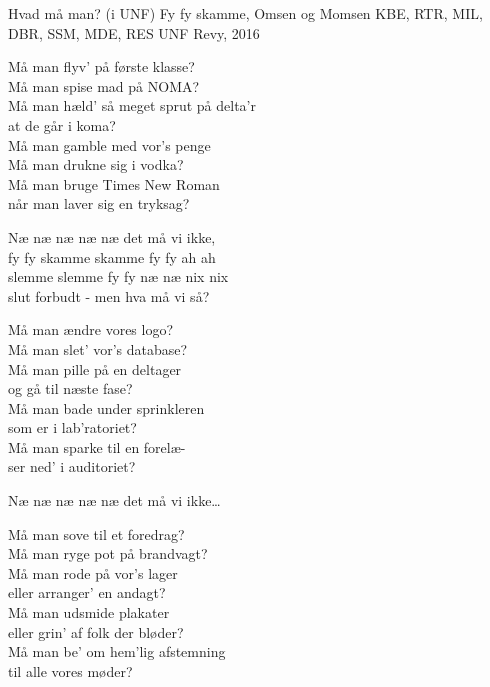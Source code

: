 \begin{song}{Hvad må man? (i UNF)}
  {} %
  {Fy fy skamme, Omsen og Momsen} %
  {KBE, RTR, MIL, DBR, SSM, MDE, RES} %
  {UNF Revy, 2016} %
  {\NotCCLIed} %

  \begin{SBVerse}
    Må man flyv’ på første klasse?\\
    Må man spise mad på NOMA?\\
    Må man hæld’ så meget sprut på delta’r\\
    at de går i koma?\\\medskip
    Må man gamble med vor’s penge \\
    Må man drukne sig i vodka?\\
    Må man bruge Times New Roman \\
    når man laver sig en tryksag?
  \end{SBVerse}

  \begin{SBChorus}
    Næ næ næ næ næ det må vi ikke,\\
    fy fy skamme skamme fy fy ah ah\\
    slemme slemme fy fy næ næ nix nix\\
    slut forbudt - men hva må vi så?
  \end{SBChorus}

  \begin{SBVerse}
    Må man ændre vores logo?\\
    Må man slet’ vor’s database?\\
    Må man pille på en deltager \\
    og gå til næste fase?\\\medskip
    Må man bade under sprinkleren\\
    som er i lab’ratoriet?\\
    Må man sparke til en forelæ-\\
    ser ned’ i auditoriet?
  \end{SBVerse}

  \begin{SBChorus}
    Næ næ næ næ næ det må vi ikke\ldots
  \end{SBChorus}

  \begin{SBVerse}
    Må man sove til et foredrag?\\
    Må man ryge pot på brandvagt?\\
    Må man rode på vor’s lager\\
    eller arranger’ en andagt?\\\medskip
    Må man udsmide plakater\\
    eller grin’ af folk der bløder?\\
    Må man be’ om hem’lig afstemning\\
    til alle vores møder?
  \end{SBVerse}


\end{song}
